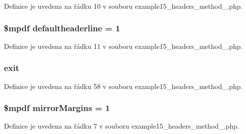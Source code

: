 Definice je uvedena na řádku 10 v souboru example15\-\_\-headers\-\_\-method\-\_.\-php.

\hypertarget{example15__headers__method__1_8php_a0f8da5f23ed7fc3ef960ec17f0517776}{
\subsubsection[{defaultheaderline}]{\setlength{\rightskip}{0pt plus 5cm}\$mpdf defaultheaderline = 1}}\label{example15__headers__method__1_8php_a0f8da5f23ed7fc3ef960ec17f0517776}


Definice je uvedena na řádku 11 v souboru example15\-\_\-headers\-\_\-method\-\_.\-php.

\hypertarget{example15__headers__method__1_8php_a6733eb5f605d09eaede9845835d71c4e}{
\subsubsection[{exit}]{\setlength{\rightskip}{0pt plus 5cm}exit}}\label{example15__headers__method__1_8php_a6733eb5f605d09eaede9845835d71c4e}


Definice je uvedena na řádku 58 v souboru example15\-\_\-headers\-\_\-method\-\_.\-php.

\hypertarget{example15__headers__method__1_8php_a24c284cb7774410f65953584ea1fd9c1}{
\subsubsection[{mirror\-Margins}]{\setlength{\rightskip}{0pt plus 5cm}\$mpdf mirror\-Margins = 1}}\label{example15__headers__method__1_8php_a24c284cb7774410f65953584ea1fd9c1}


Definice je uvedena na řádku 7 v souboru example15\-\_\-headers\-\_\-method\-\_.\-php.

